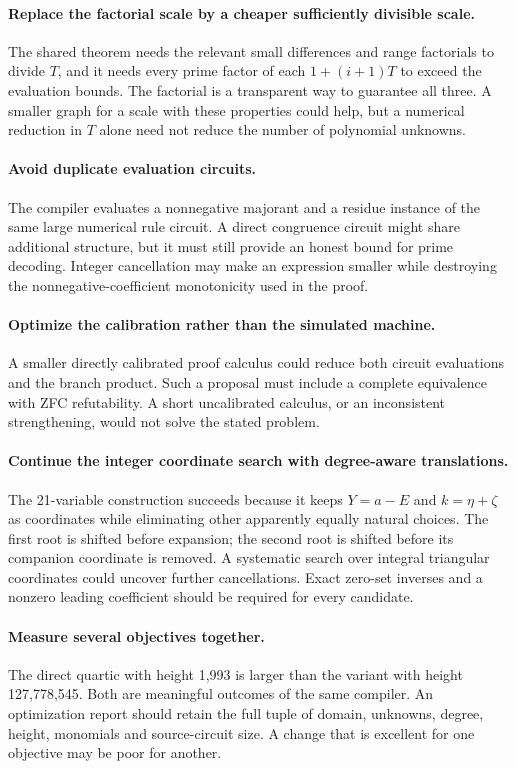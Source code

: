 \documentclass[11pt,letterpaper]{article}
\begin{document}
\paragraph{Replace the factorial scale by a cheaper sufficiently divisible scale.}
The shared theorem needs the relevant small differences and range
factorials to divide $T$, and it needs every prime factor of each
$1+(i+1)T$ to exceed the evaluation bounds. The factorial is a transparent
way to guarantee all three. A smaller graph for a scale with these
properties could help, but a numerical reduction in $T$ alone need not
reduce the number of polynomial unknowns.

\paragraph{Avoid duplicate evaluation circuits.}
The compiler evaluates a nonnegative majorant and a residue instance of
the same large numerical rule circuit. A direct congruence circuit might
share additional structure, but it must still provide an honest bound
for prime decoding. Integer cancellation may make an expression smaller
while destroying the nonnegative-coefficient monotonicity used in the
proof.

\paragraph{Optimize the calibration rather than the simulated machine.}
A smaller directly calibrated proof calculus could reduce both circuit
evaluations and the branch product. Such a proposal must include a
complete equivalence with ZFC refutability. A short uncalibrated calculus,
or an inconsistent strengthening, would not solve the stated problem.

\paragraph{Continue the integer coordinate search with degree-aware translations.}
The 21-variable construction succeeds because it keeps $Y=a-E$ and
$k=\eta+\zeta$ as coordinates while eliminating other apparently equally
natural choices. The first root is shifted before expansion; the second
root is shifted before its companion coordinate is removed. A systematic
search over integral triangular coordinates could uncover further
cancellations. Exact zero-set inverses and a nonzero leading coefficient
should be required for every candidate.

\paragraph{Measure several objectives together.}
The direct quartic with height 1,993 is larger than the variant with
height 127,778,545. Both are meaningful outcomes of the same compiler.
An optimization report should retain the full tuple of domain, unknowns,
degree, height, monomials and source-circuit size. A change that is excellent
for one objective may be poor for another.
\end{document}
